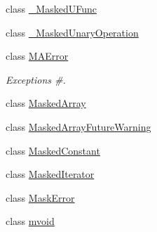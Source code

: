 \begin{DoxyCompactItemize}
class \hyperlink{classnumpy_1_1ma_1_1core_1_1__MaskedUFunc}{\+\_\+\+Masked\+U\+Func}
\item 
class \hyperlink{classnumpy_1_1ma_1_1core_1_1__MaskedUnaryOperation}{\+\_\+\+Masked\+Unary\+Operation}
\item 
class \hyperlink{classnumpy_1_1ma_1_1core_1_1MAError}{M\+A\+Error}
\begin{DoxyCompactList}\small\item\em Exceptions \#. \end{DoxyCompactList}\item 
class \hyperlink{classnumpy_1_1ma_1_1core_1_1MaskedArray}{Masked\+Array}
\item 
class \hyperlink{classnumpy_1_1ma_1_1core_1_1MaskedArrayFutureWarning}{Masked\+Array\+Future\+Warning}
\item 
class \hyperlink{classnumpy_1_1ma_1_1core_1_1MaskedConstant}{Masked\+Constant}
\item 
class \hyperlink{classnumpy_1_1ma_1_1core_1_1MaskedIterator}{Masked\+Iterator}
\item 
class \hyperlink{classnumpy_1_1ma_1_1core_1_1MaskError}{Mask\+Error}
\item 
class \hyperlink{classnumpy_1_1ma_1_1core_1_1mvoid}{mvoid}
\end{DoxyCompactItemize}
